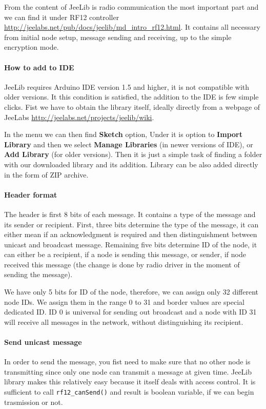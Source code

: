 \documentclass[12pt,titlepage]{article}
\begin{document}
    From the content of JeeLib is radio communication the most important part and we can find it under RF12 controller \url{http://jeelabs.net/pub/docs/jeelib/md_intro_rf12.html}. It contains all necessary from initial node setup, message sending and receiving, up to the simple encryption mode.

    \paragraph{How to add to IDE}
    JeeLib requires Arduino IDE version 1.5 and higher, it is not compatible with older versions. It this condition is satisfied, the addition to the IDE is few simple clicks. Fist we have to obtain the library itself, ideally directly from a webpage of JeeLabs \url{http://jeelabs.net/projects/jeelib/wiki}.

    In the menu we can then find \textbf{Sketch} option, Under it is option to \textbf{Import Library} and then we select \textbf{Manage Libraries} (in newer versions of IDE), or \textbf{Add Library} (for older versions). Then it is just a simple task of finding a folder with our downloaded library and its addition. Library can be also added directly in the form of ZIP archive.

    \paragraph{Header format}
    The header is first 8 bits of each message. It contains a type of the message and its sender or recipient. First, three bits determine the type of the message, it can either mean if an acknowledgment is required and then distinguishment between unicast and broadcast message. Remaining five bits determine ID of the node, it can either be a recipient, if a node is sending this message, or sender, if node received this message (the change is done by radio driver in the moment of sending the message).

    We have only 5 bits for ID of the node, therefore, we can assign only 32 different node IDs. We assign them in the range 0 to 31 and border values are special dedicated ID. ID 0 is universal for sending out broadcast and a node with ID 31 will receive all messages in the network, without distinguishing its recipient.

    \paragraph{Send unicast message}
    In order to send the message, you fist need to make sure that no other node is transmitting since only one node can transmit a message at given time. JeeLib library makes this relatively easy because it itself deals with access control.
    It is sufficient to call \texttt{rf12\_canSend()} and result is boolean variable, if we can begin trasmission or not.
\end{document}
